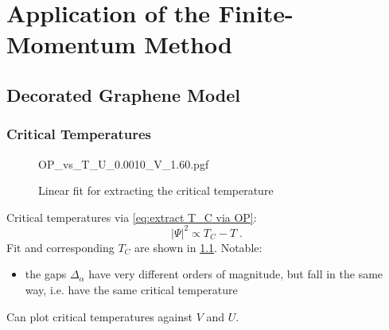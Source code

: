 \documentclass[../notes.tex]{subfiles}
\begin{document}
\raggedbottom
	
\chapter{Application of the Finite-Momentum Method}\label{ch:results}

\section{Decorated Graphene Model}

\subsection*{Critical Temperatures}


\begin{figure}[H]
	\centering
	{OP_vs_T_U_0.0010_V_1.60.pgf}
	\caption{Linear fit for extracting the critical temperature}
	\label{fig:decorated graphene OP vs T}
\end{figure}
Critical temperatures via \cref{eq:extract T_C via OP}:
\begin{equation}
	\vert \Psi \vert^2 \propto T_C - T \;.
\end{equation}
Fit and corresponding \(T_C\) are shown in \cref{fig:decorated graphene OP vs T}.
Notable:
\begin{itemize}
	\item the gaps \(\Delta_{\alpha}\) have very different orders of magnitude, but fall in the same way, i.e. have the same critical temperature
\end{itemize}

Can plot critical temperatures against \(V\) and \(U\).
\end{document}
